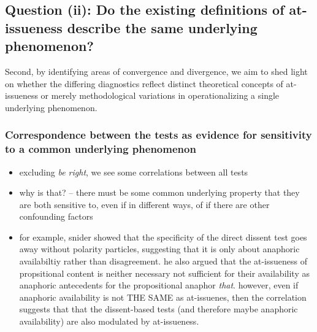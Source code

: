 \documentclass[times,linguex,xcolor]{glossa}
\begin{document}
      

  \subsection{Question (ii): Do the existing definitions of at-issueness describe the same underlying phenomenon?}
    Second, by identifying areas of convergence and divergence, we aim to shed light on whether the differing diagnostics reflect distinct theoretical concepts of at-issueness or merely methodological variations in operationalizing a single underlying phenomenon.

    \subsubsection{Correspondence between the tests as evidence for sensitivity to a common underlying phenomenon}
      

      \begin{itemize}
        \item excluding \emph{be right}, we see some correlations between all tests

        \item why is that? -- there must be some common underlying property that they are both sensitive to, even if in different ways, of if there are other confounding factors

        \item for example, snider showed that the specificity of the direct dissent test goes away without polarity particles, suggesting that it is only about anaphoric availabiltiy rather than disagreement. he also argued that the at-issueness of propsitional content is neither necessary not sufficient for their availability as anaphoric antecedents for the propositional anaphor \emph{that}. however, even if anaphoric availability is not THE SAME as at-issuenes, then the correlation suggests that that the dissent-based tests (and therefore maybe anaphoric availability) are also modulated by at-issueness.

      \end{itemize}
\end{document}
